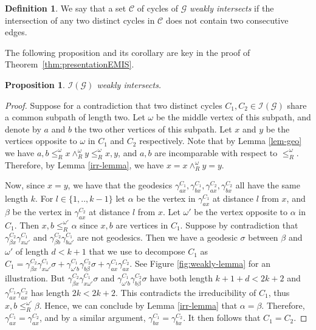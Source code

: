 \documentclass[A4paper, oneside]{amsart}
\newcommand{\Irr}{\mathcal{I}}
\newcommand{\G}{\mathcal{G}}
\newtheorem{prop}[thm]{Proposition}
\theoremstyle{definition}
\newtheorem{defi}[thm]{Definition}
\begin{document}
\begin{defi}
 We say that a set $\mathcal{C}$ of cycles of $\G$ \emph{weakly intersects} if the intersection of any two distinct cycles in $\mathcal{C}$ does not contain two consecutive edges.
\end{defi}

The following proposition and its corollary are key in the proof of Theorem~\ref{thm:presentationEMIS}.

\begin{prop} \label{weakly-lemma} $\Irr(\G)$ weakly intersects. 
\end{prop}

\begin{proof}
    Suppose for a contradiction that two distinct cycles $C_1, C_2 \in \Irr(\G)$ share a common subpath of length two. Let $\omega$ be the middle vertex of this subpath, and denote by $a$ and $b$ the two other vertices of this subpath. Let $x$ and $y$ be the vertices opposite to $\omega$ in $C_1$ and $C_2$ respectively. Note that by Lemma \ref{lem-geo} we have $a,b \leq_R^{\omega} x \wedge_R^{\omega} y \leq_R^{\omega} x,y$, and $a,b$ are incomparable with respect to $\leq_R^{\omega}$. Therefore, by Lemma \ref{irr-lemma}, we have $x = x \wedge_R^{\omega} y = y$.

    Now, since $x=y$, we have that the geodesics $\gamma_{ax}^{C_1}, \gamma_{bx}^{C_1},\gamma_{ax}^{C_2}, \gamma_{bx}^{C_2}$ all have the same length $k$. For $l \in \{1,..,k-1\}$ let $\alpha$ be the vertex in $\gamma_{ax}^{C_1}$ at distance $l$ from $x$, and $\beta$ be the vertex in $\gamma_{ax}^{C_2}$ at distance $l$ from $x$. Let $\omega'$ be the vertex opposite to $\alpha$ in $C_1$. Then $x,b \leq_R^{\omega'} \alpha$ since $x,b$ are vertices in $C_1$. Suppose by contradiction that $\gamma^{C_2}_{\beta x}\gamma^{C_1}_{x\omega'}$ and $\gamma^{C_2}_{\beta b}\gamma^{C_1}_{b\omega'}$ are not geodesics. Then we have a geodesic $\sigma$ between $\beta$ and $\omega'$ of length $d <k+1$ that we use to decompose $C_1$ as $C_1 = \gamma^{C_2}_{\beta x}\gamma^{C_1}_{x\omega'}\sigma + \gamma^{C_1}_{\omega' b} \gamma^{C_2}_{b\beta}\sigma  +\gamma^{C_1}_{ax}\gamma^{C_2}_{ax}$. See Figure \ref{fig:weakly-lemma} for an illustration. But $\gamma^{C_2}_{\beta x}\gamma^{C_1}_{x\omega'}\sigma$ and $\gamma^{C_1}_{\omega' b} \gamma^{C_2}_{b\beta}\sigma$ have both length $k+1+d<2k+2$ and $\gamma^{C_1}_{ax}\gamma^{C_2}_{ax}$ has length $2k<2k+2$. This contradicts the irreducibility of $C_1$, thus $x,b \leq_R^{\omega'} \beta$. Hence, we can conclude by Lemma \ref{irr-lemma} that $\alpha = \beta$. Therefore, $\gamma^{C_1}_{ax} = \gamma^{C_2}_{ax}$, and by a similar argument, $\gamma^{C_1}_{bx} = \gamma^{C_2}_{bx}$. It then follows that $C_1=C_2$. 
\end{proof}
\end{document}

